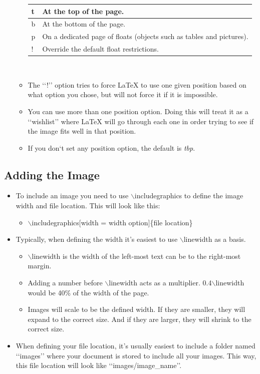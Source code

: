\begin{itemize}
\begin{itemize}
\begin{tabularx}{\textwidth}{| l | X |}
					\hline
					t & At the top of the page.\\
					\hline
					b & At the bottom of the page.\\
					\hline
					p & On a dedicated page of floats (objects such as tables and pictures).\\
					\hline
					! & Override the default float restrictions.\\
					\hline
				\end{tabularx}\\
				\item The \lq\lq{}!\rq\rq{} option tries to force \LaTeX{} to use one given position based on what option you chose, but will not force it if it is impossible.
				\item You can use more than one position option. Doing this will treat it as a \lq\lq{}wishlist\rq\rq{} where \LaTeX{} will go through each one in order trying to see if the image fits well in that position.
				\item If you don\lq{}t set any position option, the default is \textit{tbp}.
			\end{itemize}	
		\end{itemize}
	
	\subsection{Adding the Image}
		\begin{itemize}
			\item To include an image you need to use $\backslash$includegraphics to define the image width and file location. This will look like this:
			\begin{itemize}
				\item $\backslash$includegraphics[width = width option]\{file location\}
			\end{itemize}
			\item Typically, when defining the width it\rq{}s easiest to use $\backslash$linewidth as a basis.
			\begin{itemize}
				\item $\backslash$linewidth is the width of the left-most text can be to the right-most margin.
				\item Adding a number before $\backslash$linewidth acts as a multiplier. 0.4$\backslash$linewidth would be 40\% of the width of the page.
				\item Images will scale to be the defined width. If they are smaller, they will expand to the correct size. And if they are larger, they will shrink to the correct size.
			\end{itemize}
			\item When defining your file location, it\rq{}s usually easiest to include a folder named \lq\lq{}images\rq\rq{} where your document is stored to include all your images. This way, this file location will look like \lq\lq{}images/image\_name\rq\rq{}.
		\end{itemize}
	
